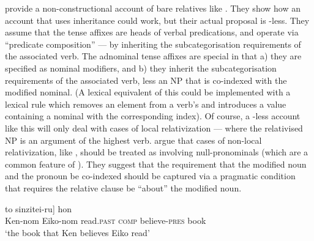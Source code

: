\documentclass[output=paper,nonflat,draftmode]{./langsci/langscibook}
\begin{document}
\cite{SiraiGunjiRelative} provide a non-constructional account of  bare relatives
like . They show how an account that uses  inheritance could
work, but their actual proposal is -less. They assume that the tense affixes
are heads of verbal predications, and operate via ``predicate composition'' --- by
inheriting the subcategorisation requirements of the associated verb. The adnominal tense
affixes are special in that a) they are specified as nominal modifiers, and b) they
inherit the subcategorisation requirements of the associated verb, less an NP that is
co-indexed with the modified nominal. (A lexical equivalent of this could be implemented with a lexical rule which removes an
element from a verb's  and introduces a  value containing a
nominal with the corresponding index). 
Of course, a -less account like this
will only deal with cases of local relativization --- where the relativised NP is an
argument of the highest verb. \citeauthor{SiraiGunjiRelative} argue that cases of
non-local relativization, like , should be treated as involving
null-pronominals (which are a common feature of ). They suggest that the requirement
that the modified noun and the pronoun be co-indexed should be captured via a pragmatic
condition that requires the relative clause be ``about'' the modified noun.
 \begin{exe}\ex\label{x:rc-85}
   \gll [Ken-ga                                  [Eiko-ga     \uGap\subscr{i} yon-da] to sinzitei-ru] hon\\
        \hspaceThis{[}Ken-{\sc nom} \hspaceThis{[}Eiko-{\sc nom} {}        read.\textsc{past} \textsc{comp}
          believe-\textsc{pres} book\\
 \glt `the book that Ken believes Eiko read'
 \end{exe}

\end{document}
